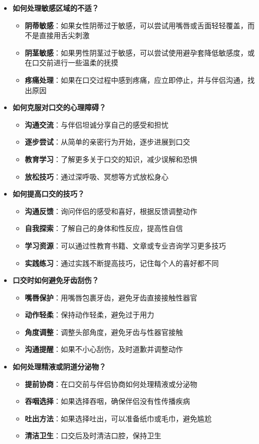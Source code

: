 \documentclass[12pt,UTF8]{ctexbook}
\begin{document}
    \begin{itemize}
    \item \textbf{如何处理敏感区域的不适？}
      \begin{itemize}
      \item \textbf{阴蒂敏感}：如果女性阴蒂过于敏感，可以尝试用嘴唇或舌面轻轻覆盖，而不是直接用舌尖刺激
      \item \textbf{阴茎敏感}：如果男性阴茎过于敏感，可以尝试使用避孕套降低敏感度，或在口交前进行一些温柔的抚摸
      \item \textbf{疼痛处理}：如果在口交过程中感到疼痛，应立即停止，并与伴侣沟通，找出原因
      \end{itemize}
    \item \textbf{如何克服对口交的心理障碍？}
      \begin{itemize}
      \item \textbf{沟通交流}：与伴侣坦诚分享自己的感受和担忧
      \item \textbf{逐步尝试}：从简单的亲密行为开始，逐步进展到口交
      \item \textbf{教育学习}：了解更多关于口交的知识，减少误解和恐惧
      \item \textbf{放松技巧}：通过深呼吸、冥想等方式放松身心
      \end{itemize}
    \item \textbf{如何提高口交的技巧？}
      \begin{itemize}
      \item \textbf{沟通反馈}：询问伴侣的感受和喜好，根据反馈调整动作
      \item \textbf{自我探索}：了解自己的身体和性反应，提高性自信
      \item \textbf{学习资源}：可以通过性教育书籍、文章或专业咨询学习更多技巧
      \item \textbf{实践练习}：通过实践不断提高技巧，记住每个人的喜好都不同
      \end{itemize}
    \item \textbf{口交时如何避免牙齿刮伤？}
      \begin{itemize}
      \item \textbf{嘴唇保护}：用嘴唇包裹牙齿，避免牙齿直接接触性器官
      \item \textbf{动作轻柔}：保持动作轻柔，避免过于用力
      \item \textbf{角度调整}：调整头部角度，避免牙齿与性器官接触
      \item \textbf{沟通提醒}：如果不小心刮伤，及时道歉并调整动作
      \end{itemize}
    \item \textbf{如何处理精液或阴道分泌物？}
      \begin{itemize}
      \item \textbf{提前协商}：在口交前与伴侣协商如何处理精液或分泌物
      \item \textbf{吞咽选择}：如果选择吞咽，确保伴侣没有性传播疾病
      \item \textbf{吐出方法}：如果选择吐出，可以准备纸巾或毛巾，避免尴尬
      \item \textbf{清洁卫生}：口交后及时清洁口腔，保持卫生
      \end{itemize}
    \end{itemize}
\end{document}
